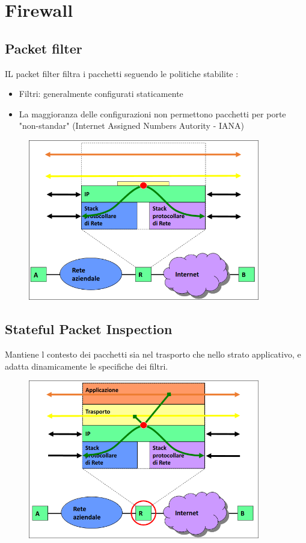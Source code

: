 \documentclass{report}
\begin{document}
        \section{Firewall}
            \subsection{Packet filter} 
                IL packet filter filtra i pacchetti seguendo le politiche stabilite :
                \begin{itemize}
                    \item Filtri: generalmente configurati staticamente
                    \item La maggioranza delle configurazioni non permettono pacchetti per porte "non-standar" (Internet Assigned Numbers Autority - IANA)
                \end{itemize}
            \begin{figure}[H]
                \includegraphics[width=0.9\textwidth]{2/pac.png}
            \end{figure}
            \subsection{Stateful Packet Inspection}
                Mantiene l contesto dei pacchetti sia nel trasporto che nello strato applicativo, e adatta dinamicamente le specifiche dei filtri.
                \begin{figure}[H]
                    \includegraphics[width=0.9\textwidth]{2/stateFull.png}
                \end{figure}
\end{document}
